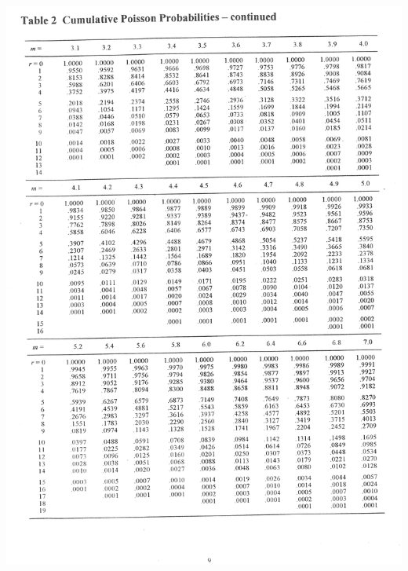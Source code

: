 \documentclass[12pt]{article}
\begin{document}
\begin{adjustwidth}{-1cm}{0cm}
\includegraphics[width=1.1\textwidth, trim = 1cm 1cm 1cm 1cm, clip]{mdpois2}
\end{adjustwidth}

\newpage
\end{document}
